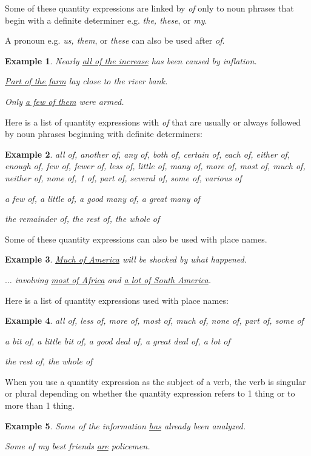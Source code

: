 \documentclass[oneside]{book}
\numberwithin{equation}{section}
\newtheorem{example}{Example}[section]
\begin{document}
%
\noindent{} Some of these quantity expressions are linked by \textit{of} only to noun phrases that begin with a definite determiner e.g. \textit{the, these}, or \textit{my}.

A pronoun e.g. \textit{us, them}, or \textit{these} can also be used after \textit{of}.
\begin{example}
    Nearly \underline{all of the increase} has been caused by inflation.
    
    \underline{Part of the farm} lay close to the river bank.
    
    Only \underline{a few of them} were armed.
\end{example}
Here is a list of quantity expressions with \textit{of} that are usually or always followed by noun phrases beginning with definite determiners:
\begin{example}
    all of, another of, any of, both of, certain of, each of, either of, enough of, few of, fewer of, less of, little of, many of, more of, most of, much of, neither of, none of, 1 of, part of, several of, some of, various of
    
    a few of, a little of, a good many of, a great many of
    
    the remainder of, the rest of, the whole of
\end{example}
%
\noindent{} Some of these quantity expressions can also be used with place names.
\begin{example}
    \underline{Much of America} will be shocked by what happened.
    
    $\ldots$ involving \underline{most of Africa} and \underline{a lot of South America}.
\end{example}
Here is a list of quantity expressions used with place names:
\begin{example}
    all of, less of, more of, most of, much of, none of, part of, some of
    
    a bit of, a little bit of, a good deal of, a great deal of, a lot of
    
    the rest of, the whole of
\end{example}
%
\noindent{} When you use a quantity expression as the subject of a verb, the verb is singular or plural depending on whether the quantity expression refers to 1 thing or to more than 1 thing.
\begin{example}
    Some of the information \underline{has} already been analyzed.
    
    Some of my best friends \underline{are} policemen.
\end{example}
\end{document}
